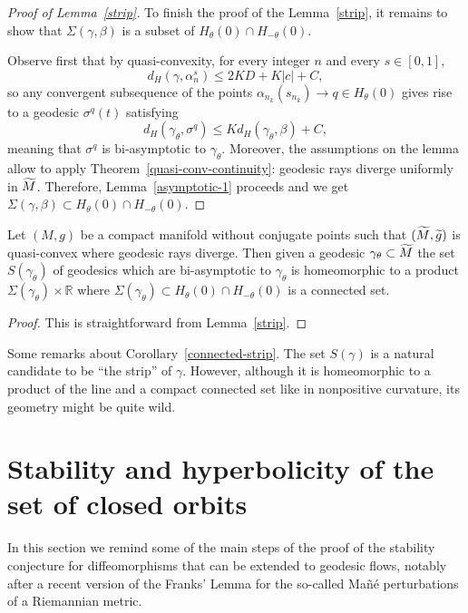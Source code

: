 \documentclass[AHL,Unicode,longabstracts,published]{cedram}
\newcommand{\bbR}{\mathbb{R}}
\let\oldtilde\tilde
\renewcommand*{\tilde}[1]{\mathchoice{\widetilde{#1}}{\widetilde{#1}}{\oldtilde{#1}}{\oldtilde{#1}}}
\begin{document}
\begin{proof}[Proof of Lemma~\ref{strip}]
To finish the proof of the Lemma~\ref{strip}, it remains to show that $\Sigma(\gamma,
\beta)$ is a subset of $H_{\theta}(0)\cap H_{-\theta}(0)$.

Observe first that by quasi-convexity, for every integer $n$ and every $s\in [0,1]$,
\[
d_{H}\left(\gamma,\alpha_n^s\right) \leq 2KD + K|c| +C,
\]
so any convergent subsequence of the points $\alpha_{n_{k}}(s_{n_{k}}) \rightarrow q \in H_{\theta}(0)$ gives rise to a geodesic $\sigma^{q}(t)$ satisfying
\[
d_{H}(\gamma_{\theta}, \sigma^{q}) \leq K d_{H}(\gamma_{\theta}, \beta) +C,
\]
meaning that $\sigma^{q}$ is bi-asymptotic to $\gamma_{\theta}$. Moreover, the assumptions on the lemma allow to apply Theorem~\ref{quasi-conv-continuity}: geodesic rays diverge uniformly in $\tilde{M}$. Therefore, Lemma~\ref{asymptotic-1} proceeds and we get $\Sigma(\gamma, \beta) \subset H_{\theta}(0)\cap H_{-\theta}(0)$.
\end{proof}

\begin{coro}\label{connected-strip}
Let $(M,g)$ be a compact manifold without conjugate points such that $(\tilde{M}, \tilde{g})$ is quasi-convex where geodesic rays diverge. Then given a geodesic $\gamma_{\theta} \subset \tilde{M}$ the set $S(\gamma_{\theta})$ of geodesics which are bi-asymptotic to $\gamma_{\theta}$ is homeomorphic to a product $\Sigma(\gamma_{\theta}) \times \bbR$ where $\Sigma(\gamma_{\theta}) \subset H_{\theta}(0)\cap H_{-\theta}(0)$ is a connected set.
\end{coro}

\begin{proof}
This is straightforward from Lemma~\ref{strip}.
\end{proof}

Some remarks about Corollary~\ref{connected-strip}. The set $S(\gamma)$ is a natural candidate to be ``the strip'' of $\gamma$. However, although it is homeomorphic to a product of the line and a compact connected set like in nonpositive curvature, its geometry might be quite wild.

\section{Stability and hyperbolicity of the set of closed orbits}\label{SECclosedorbits}

In this section we remind some of the main steps of the proof of the stability conjecture for diffeomorphisms that can be extended to geodesic flows, notably after a recent version of the Franks' Lemma for the so-called Mañé perturbations of a Riemannian metric.
\end{document}
